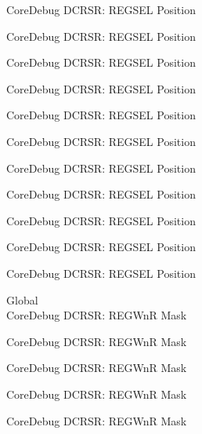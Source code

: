 \begin{DoxyRefList}
\label{deprecated__deprecated000405}%
%
Core\+Debug DCRSR\+: REGSEL Position 

\label{deprecated__deprecated000494}%
%
Core\+Debug DCRSR\+: REGSEL Position 

\label{deprecated__deprecated000596}%
%
Core\+Debug DCRSR\+: REGSEL Position 

\label{deprecated__deprecated000721}%
%
Core\+Debug DCRSR\+: REGSEL Position 

\label{deprecated__deprecated000809}%
%
Core\+Debug DCRSR\+: REGSEL Position 

\label{deprecated__deprecated000865}%
%
Core\+Debug DCRSR\+: REGSEL Position 

\label{deprecated__deprecated000948}%
%
Core\+Debug DCRSR\+: REGSEL Position 

\label{deprecated__deprecated001007}%
%
Core\+Debug DCRSR\+: REGSEL Position 

\label{deprecated__deprecated001083}%
%
Core\+Debug DCRSR\+: REGSEL Position 

\label{deprecated__deprecated001172}%
%
Core\+Debug DCRSR\+: REGSEL Position 

\label{deprecated__deprecated001274}%
%
Core\+Debug DCRSR\+: REGSEL Position  
\item[Global \doxylink{group___c_m_s_i_s___core_debug_ga1eef4992d8f84bc6c0dffed1c87f90a5}{Core\+Debug\+\_\+\+DCRSR\+\_\+\+REGWn\+R\+\_\+\+Msk} ]\hfill \\
\label{deprecated__deprecated000042}%
%
Core\+Debug DCRSR\+: REGWnR Mask 

\label{deprecated__deprecated000130}%
%
Core\+Debug DCRSR\+: REGWnR Mask 

\label{deprecated__deprecated000186}%
%
Core\+Debug DCRSR\+: REGWnR Mask 

\label{deprecated__deprecated000269}%
%
Core\+Debug DCRSR\+: REGWnR Mask 

\label{deprecated__deprecated000328}%
%
Core\+Debug DCRSR\+: REGWnR Mask 


\end{DoxyRefList}
